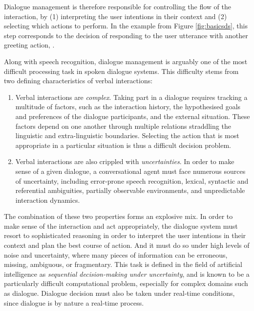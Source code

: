 Dialogue management is therefore responsible for controlling the flow of the interaction, by (1) interpreting the user intentions in their context and (2) selecting which actions to perform. In the example from Figure \ref{fig:basicsds}, this step corresponds to the decision of responding to the user utterance  with another greeting action, . 

Along with speech recognition, dialogue management is arguably one of the most difficult processing task in spoken dialogue systems. This difficulty stems from two defining characteristics of verbal interactions:
\begin{enumerate}
\item Verbal interactions are \textit{complex}.   Taking part in a dialogue requires tracking a multitude of factors, such as the interaction history, the hypothesised goals and preferences of the dialogue participants, and the external situation. These factors depend on one another through multiple relations straddling the linguistic and extra-linguistic boundaries.  Selecting the action that is most appropriate in a particular situation is thus a difficult decision problem. 

\item Verbal interactions are also crippled with \textit{uncertainties}.  In order to make sense of a given dialogue, a conversational agent must face numerous sources of uncertainty, including error-prone speech recognition, lexical,  syntactic and referential ambiguities, partially observable environments, and unpredictable interaction dynamics.  
\end{enumerate} 

The combination of these two properties forms an explosive mix.  In order to make sense of the interaction and act appropriately, the dialogue system must resort to sophisticated reasoning in order to interpret the user intentions in their context and plan the best course of action.  And it must do so under high levels of noise and uncertainty, where many pieces of information can be erroneous, missing, ambiguous, or fragmentary. This task is defined in the field of artificial intelligence as \textit{sequential decision-making under uncertainty}, and is known to be a particularly difficult computational problem, especially for complex domains such as dialogue. Dialogue decision must also be taken under real-time conditions, since dialogue is by nature a real-time process. 

